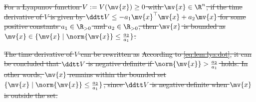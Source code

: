 \documentclass[letterpaper, journal]{IEEEtran}
\providecommand{\DIFdel}[1]{{\protect\color{red}\sout{#1}}} %
\providecommand{\DIFdelbegin}{} %
\providecommand{\DIFdelend}{} %
\begin{document}
\DIFdelbegin %
\DIFdel{For a Lyapunov function $V:=V(\mv{x})\ge0$ with $\mv{x}\in\R^n$, if the time derivative of $V$ is given by $\ddtt V\le -a_1 \mv{x}^\top \mv{x} + a_2 \mv{x}$ for some positive constants $a_1\in\R_{>0}$ and $a_2\in\R_{>0}$, then $\mv{x}$ is bounded as $\mv{x}\in\{\mv{x}\mid\norm{\mv{x}}\le\tfrac{a_2}{a_1}\}$.
}%
\DIFdelend %

\DIFdelbegin %
\DIFdel{The time derivative of $V$ can be rewritten as
    }%
\DIFdel{According to \eqref{eq:lem:lya:dot}, it can be concluded that $\ddtt V$ is negative definite if $\norm{\mv{x}}>\tfrac{a_2}{a_1}$ holds.
    In other words, $\mv{x}$ remains within the bounded set $\{\mv{x}\mid\norm{\mv{x}}\le\tfrac{a_2}{a_1}\}$, since $\ddtt V$ is negative definite when $\mv{x}$ is outside the set.
}%
\DIFdelend %
\end{document}
